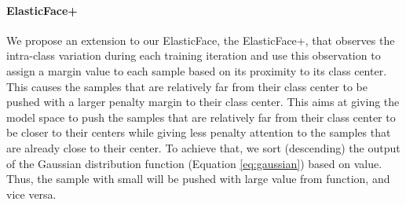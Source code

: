 \documentclass[letterpaper, 10 pt, conference]{ieeeconf}  \usepackage{times}
\begin{document}
\paragraph{ElasticFace+}
We propose an extension to our ElasticFace, the ElasticFace+, that observes the intra-class variation during each training iteration and use this observation to assign a margin value to each sample based on its proximity to its class center.
This causes the samples that are relatively far from their class center to be pushed with a larger penalty margin to their class center.
This aims at giving the model space to push the samples that are relatively far from their class center to be closer to their centers while giving less penalty attention to the samples that are already close to their center.
To achieve that, we sort (descending) the output of the Gaussian distribution function (Equation \ref{eq:gaussian}) based on  value. 
Thus, the sample with small  will be pushed with large value from  function, and vice versa. 
\end{document}
